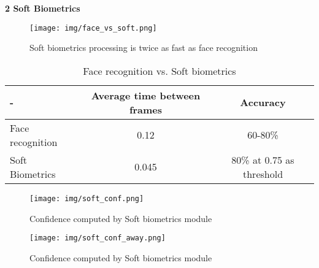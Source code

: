 \documentclass[12pt]{article}			%
\begin{document}

{\LARGE \bf 2  Soft Biometrics}
\begin{figure}[h]
	\centering
	\texttt{[image: img/face\_vs\_soft.png]}
	\caption{ \small Soft biometrics processing is twice as fast as face recognition} 
	\label{fig:sb1}
\end{figure}

\begin{table}[htp]
\centering
\caption{Face recognition vs. Soft biometrics}
\begin{tabular}{||l|c|c||} \hline \hline
-                  &  Average time between frames  &  Accuracy \\ \hline
Face recognition   &  0.12                         &  60-80\% \\ \hline
Soft Biometrics    &  0.045                        &  80\% at 0.75 as threshold \\ \hline \hline
\end{tabular}
\end{table}

\begin{figure}[h]
	\centering
	\texttt{[image: img/soft\_conf.png]}
	\caption{ \small Confidence computed by Soft biometrics module}
	\label{fig:sb2}
\end{figure}

\begin{figure}[h]
	\centering
	\texttt{[image: img/soft\_conf\_away.png]}
	\caption{ \small Confidence computed by Soft biometrics module}
	\label{fig:sb2}
\end{figure}
\end{document}
